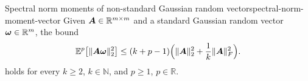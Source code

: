 \begin{lemma}{Spectral norm moments of non-standard Gaussian random vector}{spectral-norm-moment-vector}
    Given $\boldsymbol{A} \in \mathbb{R}^{m \times m}$ and a standard Gaussian random vector $\boldsymbol{\omega} \in \mathbb{R}^{m}$, the bound
    \[
        \mathbb{E}^{p}\big[ \lVert \boldsymbol{A} \boldsymbol{\omega} \rVert _2^2 \big]
        \leq  (k + p - 1) \Big( \lVert \boldsymbol{A} \rVert _2^2 + \frac{1}{k} \lVert \boldsymbol{A} \rVert _F^2 \Big).
    \]
    holds for every $k \ge 2$, $k\in \mathbb{N}$, and $p \ge 1$, $p\in \mathbb R$.
\end{lemma}
